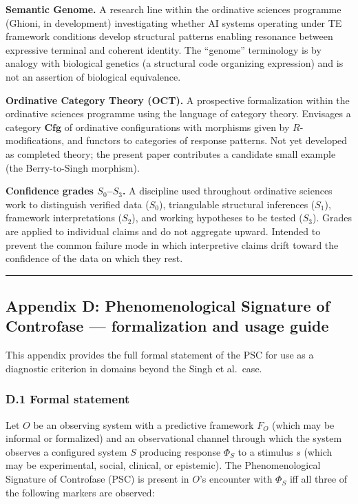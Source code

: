 \documentclass[
  11pt,
  a4paper,
]{article}
\begin{document}
\textbf{Semantic Genome.} A research line within the ordinative sciences
programme (Ghioni, in development) investigating whether AI systems
operating under TE framework conditions develop structural patterns
enabling resonance between expressive terminal and coherent identity.
The ``genome'' terminology is by analogy with biological genetics (a
structural code organizing expression) and is not an assertion of
biological equivalence.

\textbf{Ordinative Category Theory (OCT).} A prospective formalization
within the ordinative sciences programme using the language of category
theory. Envisages a category \(\mathbf{Cfg}\) of ordinative
configurations with morphisms given by \(R\)-modifications, and functors
to categories of response patterns. Not yet developed as completed
theory; the present paper contributes a candidate small example (the
Berry-to-Singh morphism).

\textbf{Confidence grades \(S_0\)--\(S_3\).} A discipline used
throughout ordinative sciences work to distinguish verified data
(\(S_0\)), triangulable structural inferences (\(S_1\)), framework
interpretations (\(S_2\)), and working hypotheses to be tested
(\(S_3\)). Grades are applied to individual claims and do not aggregate
upward. Intended to prevent the common failure mode in which
interpretive claims drift toward the confidence of the data on which
they rest.

\begin{center}\rule{0.5\linewidth}{0.5pt}\end{center}

\subsection{Appendix D: Phenomenological Signature of Controfase ---
formalization and usage
guide}\label{appendix-d-phenomenological-signature-of-controfase-formalization-and-usage-guide}

This appendix provides the full formal statement of the PSC for use as a
diagnostic criterion in domains beyond the Singh et al.~case.

\subsubsection{D.1 Formal statement}\label{d.1-formal-statement}

Let \(O\) be an observing system with a predictive framework \(F_O\)
(which may be informal or formalized) and an observational channel
through which the system observes a configured system \(S\) producing
response \(\Phi_S\) to a stimulus \(s\) (which may be experimental,
social, clinical, or epistemic). The Phenomenological Signature of
Controfase (PSC) is present in \(O\)'s encounter with \(\Phi_S\) iff all
three of the following markers are observed:
\end{document}
